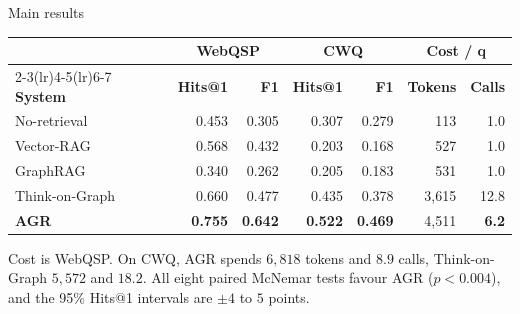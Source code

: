 \begin{frame}{Main results}
  \bodyshift{-2.75pt}
  \begin{table}
    \small
    \renewcommand{\arraystretch}{1.1}
    \begin{tabular}{@{}lrr@{\hspace{7mm}}rr@{\hspace{7mm}}rr@{}}
      \toprule
      & \multicolumn{2}{c}{\textbf{WebQSP}}
      & \multicolumn{2}{c}{\textbf{CWQ}}
      & \multicolumn{2}{c}{\textbf{Cost / q}} \\
      \cmidrule(lr){2-3}\cmidrule(lr){4-5}\cmidrule(lr){6-7}
      \textbf{System} & \textbf{Hits@1} & \textbf{F1}
                      & \textbf{Hits@1} & \textbf{F1}
                      & \textbf{Tokens} & \textbf{Calls} \\
      \midrule
      No-retrieval    & 0.453 & 0.305 & 0.307 & 0.279 & 113   & 1.0 \\
      Vector-RAG      & 0.568 & 0.432 & 0.203 & 0.168 & 527   & 1.0 \\
      GraphRAG        & 0.340 & 0.262 & 0.205 & 0.183 & 531   & 1.0 \\
      Think-on-Graph  & 0.660 & 0.477 & 0.435 & 0.378 & 3{,}615 & 12.8 \\
      \textbf{AGR}    & \textbf{0.755} & \textbf{0.642}
                      & \textbf{0.522} & \textbf{0.469}
                      & 4{,}511 & \textbf{6.2} \\
      \bottomrule
    \end{tabular}
  \end{table}
  {\small\agrraggedright Cost is WebQSP. On CWQ, AGR spends $6{,}818$
  tokens and $8.9$ calls, Think-on-Graph $5{,}572$ and $18.2$. All eight
  paired McNemar tests favour AGR ($p < 0.004$), and the 95\% Hits@1
  intervals are $\pm 4$ to $5$ points.\par}
\end{frame}

